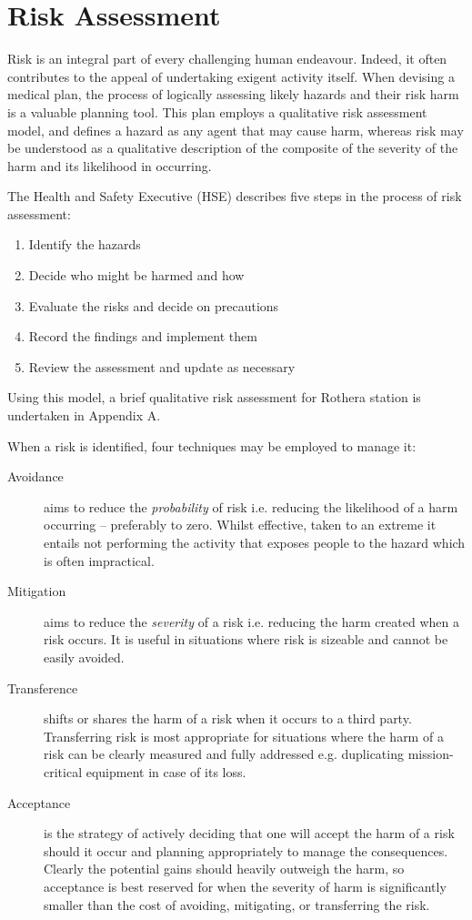 \documentclass[12pt,a4paper]{article}
\begin{document}
\section{Risk Assessment}

Risk is an integral part of every challenging human endeavour. Indeed, it often contributes to the appeal of undertaking exigent activity itself. When devising a medical plan, the process of logically assessing likely hazards and their risk harm is a valuable planning tool. This plan employs a qualitative risk assessment model, and defines a hazard as any agent that may cause harm, whereas risk may be understood as a qualitative description of the composite of the severity of the harm and its likelihood in occurring.\cite{TheNationalPatientSafetyAgency:2007ud}

The Health and Safety Executive (HSE) describes five steps\cite{HSE:2012tp} in the process of risk assessment:

\begin{enumerate}
    \item Identify the hazards
    \item Decide who might be harmed and how
    \item Evaluate the risks and decide on precautions
    \item Record the findings and implement them
    \item Review the assessment and update as necessary
\end{enumerate}

Using this model, a brief qualitative risk assessment for Rothera station is undertaken in Appendix A.

When a risk is identified, four techniques may be employed to manage it:

\begin{description}
    \item[Avoidance] aims to reduce the \emph{probability} of risk i.e. reducing the likelihood of a harm occurring -- preferably to zero. Whilst effective, taken to an extreme it entails not performing the activity that exposes people to the hazard which is often impractical.
    \item[Mitigation] aims to reduce the \emph{severity} of a risk i.e. reducing the harm created when a risk occurs. It is useful in situations where risk is sizeable and cannot be easily avoided.
    \item[Transference] shifts or shares the harm of a risk when it occurs to a third party. Transferring risk is most appropriate for situations where the harm of a risk can be clearly measured and fully addressed e.g. duplicating mission-critical equipment in case of its loss.
    \item[Acceptance] is the strategy of actively deciding that one will accept the harm of a risk should it occur and planning appropriately to manage the consequences. Clearly the potential gains should heavily outweigh the harm, so acceptance is best reserved for when the severity of harm is significantly smaller than the cost of avoiding, mitigating, or transferring the risk.
\end{description}
\end{document}
